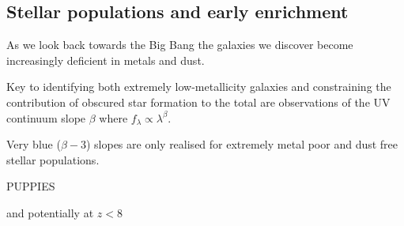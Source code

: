 \documentclass[12pt]{article}
\begin{document}






\subsection*{Stellar populations and early enrichment}\label{sec:properties}


As we look back towards the Big Bang the galaxies we discover become increasingly deficient in metals and dust. 

Key to identifying both extremely low-metallicity galaxies and constraining the contribution of obscured star formation to the total are observations of the UV continuum slope $\beta$ where $f_{\lambda}\propto\lambda^{\beta}$. 

Very blue ($\beta -3$) slopes are only realised for extremely metal poor and dust free stellar populations.

PUPPIES 

and potentially at $z<8$ 
\end{document}
